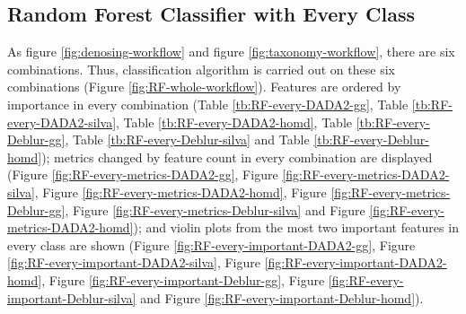 \documentclass[a4paper]{article}
\begin{document}
        \subsection{Random Forest Classifier with Every Class}
            As figure \ref{fig:denosing-workflow} and figure \ref{fig:taxonomy-workflow}, there are six combinations. Thus, classification algorithm is carried out on these six combinations (Figure \ref{fig:RF-whole-workflow}). Features are ordered by importance in every combination (Table \ref{tb:RF-every-DADA2-gg}, Table \ref{tb:RF-every-DADA2-silva}, Table \ref{tb:RF-every-DADA2-homd}, Table \ref{tb:RF-every-Deblur-gg}, Table \ref{tb:RF-every-Deblur-silva} and Table \ref{tb:RF-every-Deblur-homd}); metrics changed by feature count in every combination are displayed (Figure \ref{fig:RF-every-metrics-DADA2-gg}, Figure \ref{fig:RF-every-metrics-DADA2-silva}, Figure \ref{fig:RF-every-metrics-DADA2-homd}, Figure \ref{fig:RF-every-metrics-Deblur-gg}, Figure \ref{fig:RF-every-metrics-Deblur-silva} and Figure \ref{fig:RF-every-metrics-DADA2-homd}); and violin plots from the most two important features in every class are shown (Figure \ref{fig:RF-every-important-DADA2-gg}, Figure \ref{fig:RF-every-important-DADA2-silva}, Figure \ref{fig:RF-every-important-DADA2-homd}, Figure \ref{fig:RF-every-important-Deblur-gg}, Figure \ref{fig:RF-every-important-Deblur-silva} and Figure \ref{fig:RF-every-important-Deblur-homd}).
\end{document}
